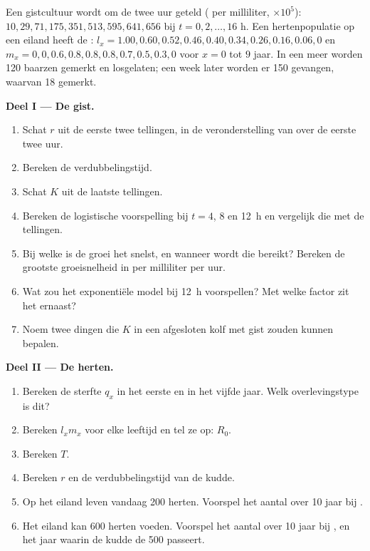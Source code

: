 \begin{problem}
\label{pb:b1:populations:1}
Een gistcultuur wordt om de twee uur geteld ( per milliliter,
$\times 10^5$): $10, 29, 71, 175, 351, 513, 595, 641, 656$ bij $t = 0,
2, \ldots, 16$ h. Een hertenpopulatie op een eiland heeft de :
$l_x = 1.00, 0.60, 0.52, 0.46, 0.40, 0.34, 0.26, 0.16, 0.06, 0$ en
$m_x = 0, 0, 0.6, 0.8, 0.8, 0.8, 0.7, 0.5, 0.3, 0$ voor $x = 0$ tot $9$
jaar. In een meer worden 120 baarzen gemerkt en losgelaten; een week later
worden er 150 gevangen, waarvan 18 gemerkt.

\medskip
\noindent\textbf{Deel I --- De gist.}
\begin{enumerate}
  \item Schat $r$ uit de eerste twee tellingen, in de veronderstelling
        van  over de eerste twee uur.
  \item Bereken de verdubbelingstijd.
  \item Schat $K$ uit de laatste tellingen.
  \item Bereken de logistische voorspelling bij $t = 4$, $8$ en
        \qty{12}{h} en vergelijk die met de tellingen.
  \item Bij welke  is de groei het snelst, en wanneer wordt die
        bereikt? Bereken de grootste groeisnelheid in  per
        milliliter per uur.
  \item Wat zou het exponentiële model bij \qty{12}{h} voorspellen? Met
        welke factor zit het ernaast?
  \item Noem twee dingen die $K$ in een afgesloten kolf met gist zouden
        kunnen bepalen.
\end{enumerate}

\medskip
\noindent\textbf{Deel II --- De herten.}
\begin{enumerate}[resume]
  \item Bereken de sterfte $q_x$ in het eerste en in het vijfde jaar.
        Welk overlevingstype is dit?
  \item Bereken $l_x m_x$ voor elke leeftijd en tel ze op: $R_0$.
  \item Bereken $T$.
  \item Bereken $r$ en de verdubbelingstijd van de kudde.
  \item Op het eiland leven vandaag 200 herten. Voorspel het aantal over
        10 jaar bij .
  \item Het eiland kan 600 herten voeden. Voorspel het aantal over 10
        jaar bij , en het jaar waarin de kudde de 500
        passeert.
\end{enumerate}


\end{problem}
